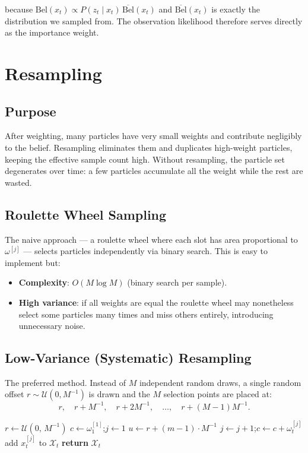 \documentclass[11pt,a4paper]{article}
\theoremstyle{definition}
\theoremstyle{plain}
\theoremstyle{remark}
\begin{document}
because $\mathrm{Bel}(x_t) \propto P(z_t \mid x_t)\,\overline{\mathrm{Bel}}(x_t)$ and $\overline{\mathrm{Bel}}(x_t)$ is exactly the distribution we sampled from. The observation likelihood therefore serves directly as the importance weight.

\section{Resampling}

\subsection{Purpose}

After weighting, many particles have very small weights and contribute negligibly to the belief. Resampling eliminates them and duplicates high-weight particles, keeping the effective sample count high. Without resampling, the particle set degenerates over time: a few particles accumulate all the weight while the rest are wasted.

\subsection{Roulette Wheel Sampling}

The naive approach — a roulette wheel where each slot has area proportional to $\omega^{[j]}$ — selects particles independently via binary search. This is easy to implement but:
\begin{itemize}
    \item \textbf{Complexity}: $O(M \log M)$ (binary search per sample).
    \item \textbf{High variance}: if all weights are equal the roulette wheel may nonetheless select some particles many times and miss others entirely, introducing unnecessary noise.
\end{itemize}

\subsection{Low-Variance (Systematic) Resampling}

The preferred method. Instead of $M$ independent random draws, a single random offset $r \sim \mathcal{U}(0, M^{-1})$ is drawn and the $M$ selection points are placed at:
\[
r,\quad r + M^{-1},\quad r + 2M^{-1},\quad \ldots,\quad r + (M-1)M^{-1}.
\]

\begin{tcolorbox}[colback=blue!5!white,colframe=blue!75!black,title=\textbf{Low-Variance Resampling Algorithm}]
\begin{algorithmic}
\STATE $r \leftarrow \mathcal{U}(0,\, M^{-1})$
\STATE $c \leftarrow \omega_1^{[1]}$;\quad $j \leftarrow 1$
    \STATE $u \leftarrow r + (m-1) \cdot M^{-1}$
        \STATE $j \leftarrow j + 1$;\quad $c \leftarrow c + \omega_t^{[j]}$
    \ENDWHILE
    \STATE add $x_t^{[j]}$ to $\mathcal{X}_t$
\ENDFOR
\STATE \textbf{return} $\mathcal{X}_t$
\end{algorithmic}
\end{tcolorbox}
\end{document}
